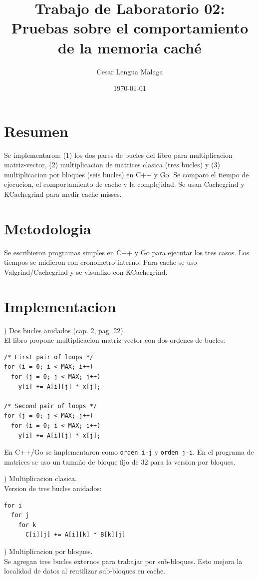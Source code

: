 \documentclass[11pt]{article}
\title{Trabajo de Laboratorio 02: Pruebas sobre el comportamiento de la memoria caché}
\author{Cesar Lengua Malaga}
\date{\today}
\begin{document}
\maketitle

\section*{Resumen}
Se implementaron: (1) los dos pares de bucles del libro para multiplicacion matriz-vector, (2) multiplicacion de matrices clasica (tres bucles) y (3) multiplicacion por bloques (seis bucles) en C++ y Go. Se comparo el tiempo de ejecucion, el comportamiento de cache y la complejidad. Se usan Cachegrind y KCachegrind para medir cache misses.

\section*{Metodologia}
Se escribieron programas simples en C++ y Go para ejecutar los tres casos. Los tiempos se midieron con cronometro interno. Para cache se uso Valgrind/Cachegrind y se visualizo con KCachegrind.

\section*{Implementacion}
) Dos bucles anidados (cap. 2, pag. 22). \\
El libro propone multiplicacion matriz-vector con dos ordenes de bucles:
\begin{verbatim}
/* First pair of loops */
for (i = 0; i < MAX; i++)
  for (j = 0; j < MAX; j++)
    y[i] += A[i][j] * x[j];

/* Second pair of loops */
for (j = 0; j < MAX; j++)
  for (i = 0; i < MAX; i++)
    y[i] += A[i][j] * x[j];
\end{verbatim}
En C++/Go se implementaron como \texttt{orden i-j} y \texttt{orden j-i}.
En el programa de matrices se uso un tamaño de bloque fijo de 32 para la version por bloques.

) Multiplicacion clasica. \\
Version de tres bucles anidados:
\begin{verbatim}
for i
  for j
    for k
      C[i][j] += A[i][k] * B[k][j]
\end{verbatim}

) Multiplicacion por bloques. \\
Se agregan tres bucles externos para trabajar por sub-bloques. Esto mejora la localidad de datos al reutilizar sub-bloques en cache.
\end{document}
